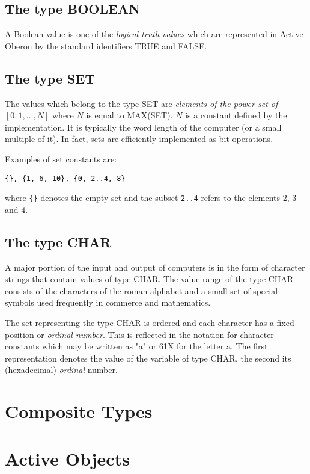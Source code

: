 \documentclass[a4paper,11pt]{article}
\begin{document}
\subsection{The type BOOLEAN} \label{subsection:BooleanType}
A Boolean value is one of the {\em logical truth values} which are represented in Active Oberon by the standard identifiers TRUE and FALSE.

\subsection{The type SET} \label{subsection:SetType}
The values which belong to the type SET are {\em elements of the power set of} $[0, 1, \ldots, N]$ where $N$ is equal to MAX(SET). $N$ is a constant defined by the implementation. It is typically the word length of the computer (or a small multiple of it). In fact, sets are efficiently implemented as bit operations.

Examples of set constants are:
\begin{lstlisting}[language=Oberon,frame=none]
{}, {1, 6, 10}, {0, 2..4, 8}
\end{lstlisting}

where \verb+{}+ denotes the empty set and the subset \verb+2..4+ refers to the elements 2, 3 and 4.

\subsection{The type CHAR}
A major portion of the input and output of computers is in the form of character strings that contain values of type CHAR. The value range of the type CHAR consists of the characters of the roman alphabet and a small set of special symbols used frequently in commerce and mathematics. 

The set representing the type CHAR is ordered and each character has a fixed position or {\em ordinal number}. This is reflected in the notation for character constants which may be written as "a" or 61X for the letter a. The first representation denotes the value of the variable of type CHAR, the second its (hexadecimal) {\em ordinal} number.

\section{Composite Types}\label{section:CompositeTypes}

\section{Active Objects}
\end{document}
